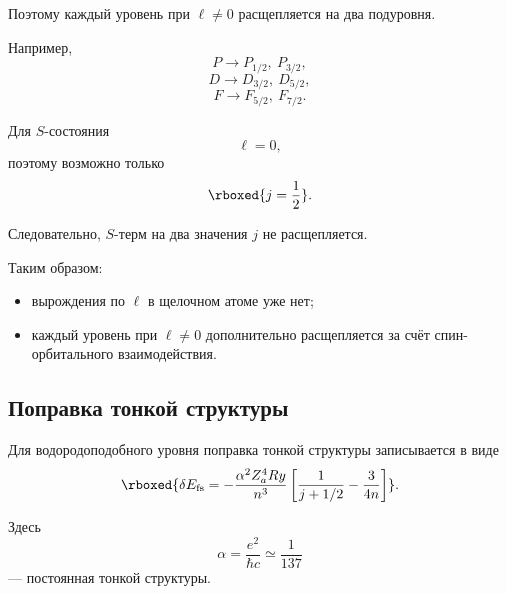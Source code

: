 \documentclass[../final.tex]{subfiles}
\begin{document}
Поэтому каждый уровень при \(\ell\neq0\) расщепляется на два подуровня.

Например,
\begin{equation*}
    P
    \longrightarrow
    P_{1/2},
    \ P_{3/2},
\end{equation*}
\begin{equation*}
    D
    \longrightarrow
    D_{3/2},
    \ D_{5/2},
\end{equation*}
\begin{equation*}
    F
    \longrightarrow
    F_{5/2},
    \ F_{7/2}.
\end{equation*}

Для \(S\)-состояния
\begin{equation*}
    \ell=0,
\end{equation*}
поэтому возможно только
\begin{equation*}
    \rboxed{
        j=\frac12
    }.
\end{equation*}

Следовательно, \(S\)-терм на два значения \(j\) не расщепляется.

Таким образом:

\begin{itemize}
    \item вырождения по \(\ell\) в щелочном атоме уже нет;
    \item каждый уровень при \(\ell\neq0\) дополнительно расщепляется
    за счёт спин-орбитального взаимодействия.
\end{itemize}

%
%

\subsection{Поправка тонкой структуры}

Для водородоподобного уровня поправка тонкой структуры записывается
в виде
\begin{equation*}
    \rboxed{
        \delta E_{\mathrm{fs}}
        =
        -\frac{\alpha^2Z_a^4Ry}{n^3}
        \left[
            \frac{1}{j+1/2}
            -
            \frac{3}{4n}
        \right]
    }.
\end{equation*}

Здесь
\begin{equation*}
    \alpha
    =
    \frac{e^2}{\hbar c}
    \simeq
    \frac{1}{137}
\end{equation*}
--- постоянная тонкой структуры.
\end{document}
